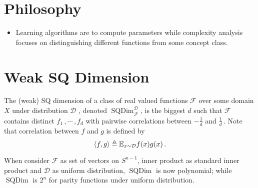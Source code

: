 \documentclass[12pt]{article}
\DeclareMathOperator{\WSQD}{SQDim}
\begin{document}
\section{Philosophy}
\begin{itemize}
  \item Learning algorithms are to compute parameters while complexity
    analysis focuses on distinguishing different functions from some
    concept class.
\end{itemize}

\section{Weak SQ Dimension}
\begin{definition}
  The (weak) SQ dimension of a class of real valued functions
  $\mathcal{F}$ over some domain $X$ under distribution $\mathcal{D}$
  , denoted $\WSQD_{\mathcal{F}}^\mathcal{D}$, is the biggest $d$ such
  that $\mathcal{F}$ contains distinct $f_1\,, \cdots\,, f_d$ with
  pairwise correlations between $-\frac{1}{d}$ and $\frac{1}{d}\,.$
  Note that correlation between $f$ and $g$ is defined by
  \begin{equation}  \nonumber
    \langle f, g \rangle \triangleq \mathbb{E}_{x \sim \mathcal{D}} f(x)g(x)\,.
  \end{equation}
\end{definition}

\begin{example}
  When consider $\mathcal{F}$ as set of vectors on $S^{n - 1}$, inner
  product as standard inner product and $\mathcal{D}$ as uniform
  distribution, $\WSQD$ is now polynomial; while $\WSQD$ is $2^n$ for
  parity functions under uniform distribution.
\end{example}
\end{document}
